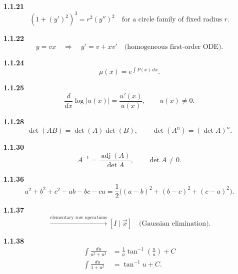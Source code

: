 \noindent\textbf{1.1.21}\quad
\begin{equation}
(1+(y')^2)^3=r^2(y'')^2
\quad\text{for a circle family of fixed radius }r.
\tag{1.1.21.1}\label{eq:circle-family}
\end{equation}

\noindent\textbf{1.1.22}\quad
\begin{equation}
y=vx\quad\Longrightarrow\quad y'=v+xv'
\quad\text{(homogeneous first-order ODE)}.
\tag{1.1.22.1}\label{eq:homogeneous-substitution}
\end{equation}

\noindent\textbf{1.1.24}\quad
\begin{equation}
\mu(x)=e^{\int P(x)\,dx}.
\tag{1.1.24.1}\label{eq:if-24}
\end{equation}

\noindent\textbf{1.1.25}\quad
\begin{equation}
\frac{d}{dx}\log|u(x)|=\frac{u'(x)}{u(x)},\qquad u(x)\ne0.
\tag{1.1.25.1}\label{eq:log-derivative-25}
\end{equation}

\noindent\textbf{1.1.28}\quad
\begin{equation}
\det(AB)=\det(A)\det(B),\qquad
\det(A^n)=(\det A)^n.
\tag{1.1.28.1}\label{eq:det-power}
\end{equation}

\noindent\textbf{1.1.30}\quad
\begin{equation}
A^{-1}=\frac{\operatorname{adj}(A)}{\det A},\qquad \det A\ne0.
\tag{1.1.30.1}\label{eq:inverse-matrix}
\end{equation}

\noindent\textbf{1.1.36}\quad
\begin{equation}
a^2+b^2+c^2-ab-bc-ca
=\frac12\bigl((a-b)^2+(b-c)^2+(c-a)^2\bigr).
\tag{1.1.36.1}\label{eq:sum-squares}
\end{equation}

\noindent\textbf{1.1.37}\quad
\begin{equation}
[A\mid\vec b]\xrightarrow{\text{elementary row operations}}[I\mid\vec x]
\quad\text{(Gaussian elimination)}.
\tag{1.1.37.1}\label{eq:gaussian-elimination}
\end{equation}

\noindent\textbf{1.1.38}\quad
\begin{align}
\int\frac{du}{a^2+u^2}&=\frac1a\tan^{-1}\left(\frac{u}{a}\right)+C
\tag{1.1.38.1}\label{eq:scaled-arctan-integral-38}\\
\int\frac{du}{1+u^2}&=\tan^{-1}u+C.
\tag{1.1.38.2}\label{eq:arctan-integral-38}
\end{align}

